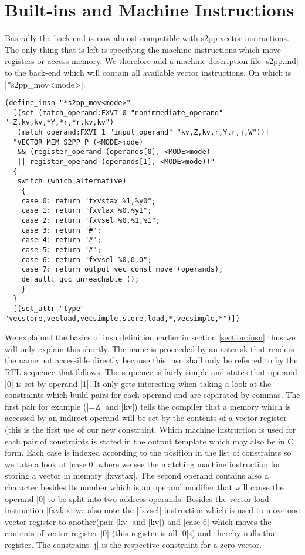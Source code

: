 \section{Built-ins and Machine Instructions}
Basically the back-end is now almost compatible with s2pp vector instructions.
The only thing that is left is specifying the machine instructions which move registers or access memory.
We therefore add a machine description file |s2pp.md| to the back-end which will contain all available vector instructions.
On which is |*s2pp_mov<mode>|:
\begin{lstlisting}
(define_insn "*s2pp_mov<mode>"
  [(set (match_operand:FXVI 0 "nonimmediate_operand" "=Z,kv,kv,*Y,*r,*r,kv,kv")
   (match_operand:FXVI 1 "input_operand" "kv,Z,kv,r,Y,r,j,W"))]
  "VECTOR_MEM_S2PP_P (<MODE>mode)
   && (register_operand (operands[0], <MODE>mode) 
   || register_operand (operands[1], <MODE>mode))"
  { 
   switch (which_alternative)
    {
    case 0: return "fxvstax %1,%y0";
    case 1: return "fxvlax %0,%y1";
    case 2: return "fxvsel %0,%1,%1";
    case 3: return "#";
    case 4: return "#";
    case 5: return "#";
    case 6: return "fxvsel %0,0,0";
    case 7: return output_vec_const_move (operands);
    default: gcc_unreachable ();
    }
  } 
  [(set_attr "type" "vecstore,vecload,vecsimple,store,load,*,vecsimple,*")])
\end{lstlisting}

We explained the basics of insn definition earlier in section \ref{section:insn} thus we will only explain this shortly.
The name is proceeded by an asterisk that renders the name not accessible directly because this insn shall only be referred to by the RTL sequence that follows.
The sequence is fairly simple and states that operand |0| is set by operand |1|.
It only gets interesting when taking a look at the constraints which build pairs for each operand and are separated by commas.
The first pair for example (|=Z| and |kv|) tells the compiler that a memory which is accessed by an indirect operand will be set by the contents of a vector register (this is the first use of our new constraint.
Which machine instruction is used for each pair of constraints is stated in the output template which may also be in C form.
Each case is indexed according to the position in the list of constraints so we take a look at |case 0| where we see the matching machine instruction for storing a vector in memory |fxvstax|.
The second operand contains also a character besides its number which is an operand modifier \cite{GCCint:asm} that will cause the operand |0| to be split into two address operands.
Besides the vector load instruction |fxvlax| we also note the |fxvsel| instruction which is used to move one vector register to another(pair |kv| and |kv|) and |case 6| which moves the contents of vector register |0| (this register is all |0|s) and thereby nulls that register.
The constraint |j| is the respective constraint for a zero vector.

